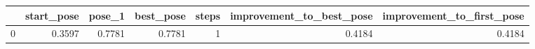 \begin{tabular}{lrrrrrr}
\toprule
{} &  start\_pose &  pose\_1 &  best\_pose &  steps &  improvement\_to\_best\_pose &  improvement\_to\_first\_pose \\
\midrule
0 &      0.3597 &  0.7781 &     0.7781 &      1 &                    0.4184 &                     0.4184 \\
\bottomrule
\end{tabular}
